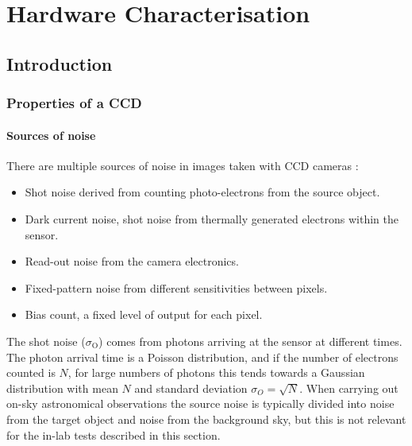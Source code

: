 \chapter{Hardware Characterisation}
\label{chap:hardware}
\chaptoc{}


\newpage
\section{Introduction}
\label{sec:hardware_intro}
\begin{colsection}


\begin{colsection}


\end{colsection}

\subsection{Properties of a CCD}
\label{sec:CCDs}
\begin{colsection}


\subsubsection{Sources of noise}

There are multiple sources of noise in images taken with CCD cameras \citep{CCDs}:

\begin{itemize}
    \item Shot noise derived from counting photo-electrons from the source object.
    \item Dark current noise, shot noise from thermally generated electrons within the sensor.
    \item Read-out noise from the camera electronics.
    \item Fixed-pattern noise from different sensitivities between pixels.
    \item Bias count, a fixed level of output for each pixel.
\end{itemize}

The shot noise ($\sigma_\text{O}$) comes from photons arriving at the sensor at different times. The photon arrival time is a Poisson distribution, and if the number of electrons counted is $N$, for large numbers of photons this tends towards a Gaussian distribution with mean $N$ and standard deviation $\sigma_O = \sqrt{N}$. When carrying out on-sky astronomical observations the source noise is typically divided into noise from the target object and noise from the background sky, but this is not relevant for the in-lab tests described in this section.


\end{colsection}
\end{colsection}
